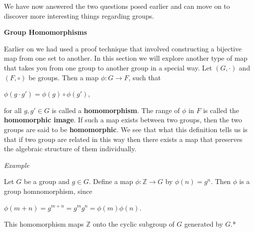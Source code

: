 \documentclass[12pt, a4paper]{article}
\begin{document}
    We have now answered the two questions posed earlier and can move on to discover more interesting things regarding groups.
    
\begin{flushleft}

    \textbf{\large{Group Homomorphisms}}\normalsize

\end{flushleft}

    Earlier on we had used a proof technique that involved constructing a bijective map from one set to another. In this section we will explore another type of map that takes you from one group to another group in a special way. Let $(G,\cdot)$ and $(F,\circ)$ be groups. Then a map $\phi\colon G\rightarrow F$, such that\par
    
\vspace{4mm}
    
    \centerline{$\phi(g\cdot g')=\phi(g)\circ\phi(g')$,}
    
\vspace{4mm}

    for all $g,g'\in G$ is called a \textbf{homomorphism}. The range of $\phi$ in $F$ is called the \textbf{homomorphic image}. If such a map exists between two groups, then the two groups are said to be \textbf{homomorphic}. We see that what this definition tells us is that if two group are related in this way then there exists a map that preserves the algebraic structure of them individually.
    
\newpage

\begin{flushleft}

    \textit{\large{Example}}

\end{flushleft}

    Let $G$ be a group and $g\in G$. Define a map $\phi\colon\mathbb{Z}\rightarrow G$ by $\phi(n)=g^n$. Then $\phi$ is a group homnomorphism, since\par
    
\vspace{4mm}

        \centerline{$\phi(m+n)=g^{m+n}=g^mg^n=\phi(m)\phi(n)$.}
        
\vspace{4mm}

    This homomorphism maps $\mathbb{Z}$ onto the cyclic subgroup of $G$ generated by $G$.* 
    
\end{document}

